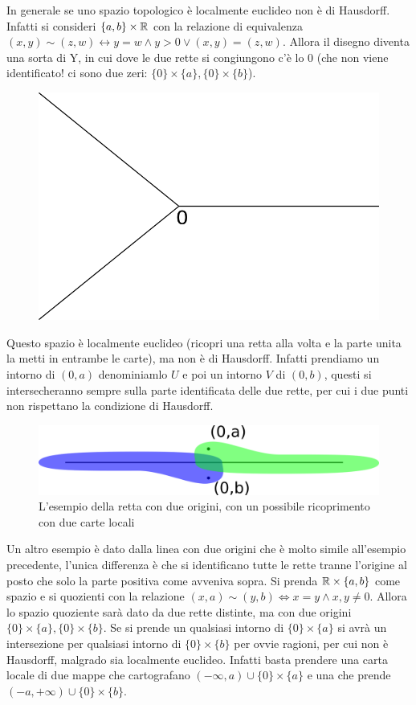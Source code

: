 \begin{remark}
	In generale se uno spazio topologico è localmente euclideo non è di Hausdorff. Infatti si consideri $\{a,b\} \times \mathbb{R}$ con la relazione di equivalenza $(x,y) \sim (z,w) \leftrightarrow y = w \land y > 0 \lor (x,y) = (z,w)$. Allora il disegno diventa una sorta di Y, in cui dove le due rette si congiungono c'è lo $0$ (che non viene identificato! ci sono due zeri: $\{0\}\times \{a\}, \{0\}\times \{b\}$).
	\begin{figure}[H]
		\centering
		\includegraphics[width=0.35\linewidth]{images/topologia_generale/lcleucnott2}
		\caption{}
		\label{fig:lcleucnott2}
	\end{figure}
	
	Questo spazio è localmente euclideo (ricopri una retta alla volta e la parte unita la metti in entrambe le carte), ma non è di Hausdorff. Infatti prendiamo un intorno di $(0,a)$ denominiamlo $U$ e poi un intorno $V$ di $(0,b)$, questi si intersecheranno sempre sulla parte identificata delle due rette, per cui i due punti non rispettano la condizione di Hausdorff. 
	
	\begin{figure}[H]
		\centering
		\includegraphics[width=0.7\linewidth]{images/topologia_generale/bug_eye}
		\caption{L'esempio della retta con due origini, con un possibile ricoprimento con due carte locali}
		\label{fig:bugeye}
	\end{figure}
	
	Un altro esempio è dato dalla linea con due origini che è molto simile all'esempio precedente, l'unica differenza è che si identificano tutte le rette tranne l'origine al posto che solo la parte positiva come avveniva sopra. Si prenda $\mathbb{R} \times \{a,b\}$ come spazio e si quozienti con la relazione $(x,a) \sim (y,b) \Longleftrightarrow x = y \land x,y \neq 0$. Allora lo spazio quoziente sarà dato da due rette distinte, ma con due origini $\{0\} \times \{a\}, \{0\}\times \{b\}$. Se si prende un qualsiasi intorno di $\{0\}\times \{a\}$ si avrà un intersezione per qualsiasi intorno di $\{0\} \times \{b\}$ per ovvie ragioni, per cui non è Hausdorff, malgrado sia localmente euclideo. Infatti basta prendere una carta locale di due mappe che cartografano $(-\infty, a) \cup \{0\}\times \{a\}$ e una che prende $(-a, +\infty) \cup \{0\}\times \{b\}$.  
\end{remark}

